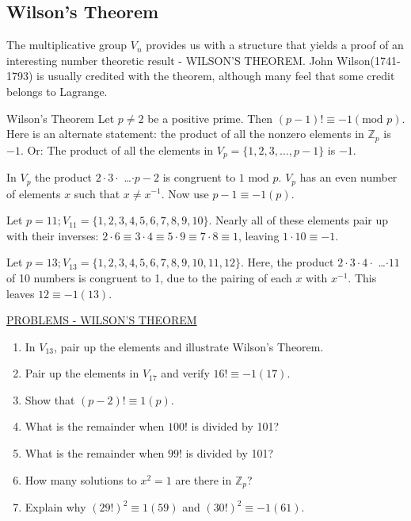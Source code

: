 \documentclass[12pt]{book}
\theoremstyle{definition}
\def\Z{\mathbb{Z}}
\begin{document}
\subsection{Wilson's Theorem}
\quad The multiplicative group $ V_n $ provides us with a structure that yields a proof of an interesting number theoretic result - WILSON'S THEOREM. John Wilson(1741-1793) is usually credited with the theorem, although many feel that some credit belongs to Lagrange.

\begin{tctheorem}{Wilson's Theorem}{}
	Let $ p\neq2 $ be a positive prime. Then $ (p-1)!\equiv -1(\text{mod } p). $ Here is an alternate statement: the product of all the nonzero elements in $ \Z_p $ is $ -1 $. Or: The product of all the elements in $ V_p=\{1,2,3,\dots , p-1\} $ is $ -1 $.
\end{tctheorem}
\begin{newproof}
In $ V_p $ the product $2\cdot 3 \cdot$ \dots $\cdot p-2  $ is congruent to $ 1 \text{ mod } p $. $ V_p $ has an even number of elements $ x $ such that $ x\neq x^{-1} $. Now use $ p-1\equiv -1(p) .$
\end{newproof}

\begin{tcexample}{}{}
Let $ p=11; V_{11}=\{1,2,3,4,5,6,7,8,9,10\}.$ Nearly all of these elements pair up with their inverses: $ 2\cdot 6\equiv 3\cdot 4 \equiv 5\cdot 9 \equiv 7 \cdot 8 \equiv 1 $, leaving $ 1\cdot 10 \equiv -1 $.
\end{tcexample}

\begin{tcexample}{}{}
 Let $ p=13; V_{13}=\{1,2,3,4,5,6,7,8,9,10,11,12\} $. Here, the product $ 2\cdot 3\cdot 4 \cdot$ \dots $ \cdot 11 $  of 10 numbers is congruent to 1, due to the pairing of each $ x $ with $ x^{-1} $. This leaves $ 12\equiv -1(13) $.\\[.2in]
\end{tcexample}
\newpage

\underline{PROBLEMS - WILSON'S THEOREM}
\begin{enumerate}
	\item In $ V_{13} $, pair up the elements and illustrate Wilson's Theorem.
	\item Pair up the elements in $ V_{17} $ and verify $ 16!\equiv -1(17) $.
	\item Show that $ (p-2)!\equiv 1(p) $.
	\item What is the remainder when $ 100! $ is divided by 101? 
	\item What is the remainder when $ 99! $ is divided by 101?
	\item How many solutions to $ x^2=1 $ are there in $ \Z_p $?
	\item Explain why $ (29!)^2\equiv 1(59) $ and $ (30!)^2\equiv -1(61). $ 
	
\end{enumerate}
\clearpage
\end{document}
